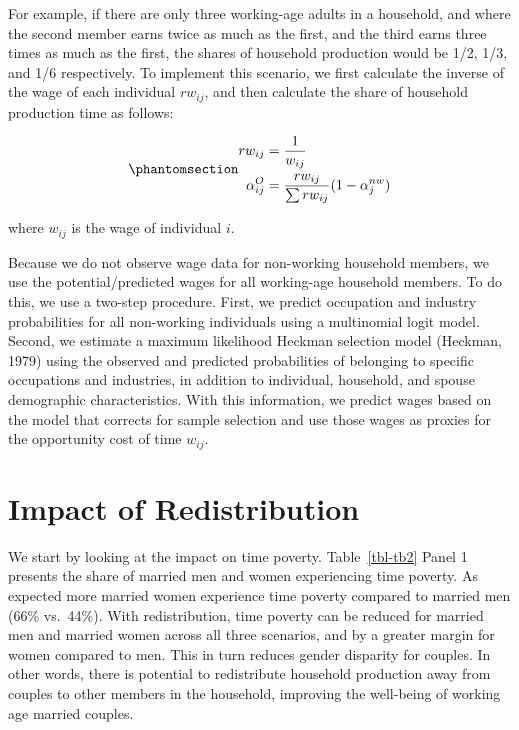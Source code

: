 \documentclass[
  11pt,
]{article}
\begin{document}
For example, if there are only three working-age adults in a household,
and where the second member earns twice as much as the first, and the
third earns three times as much as the first, the shares of household
production would be 1/2, 1/3, and 1/6 respectively. To implement this
scenario, we first calculate the inverse of the wage of each individual
\(rw_{ij}\), and then calculate the share of household production time
as follows:

\begin{equation}\phantomsection\label{eq-r3}{\begin{aligned}
rw_{ij} &= \frac{1}{w_{ij}} \\
\alpha_{ij}^O &= \frac{rw_{ij}}{\sum rw_{ij}} (1-\alpha_{j}^{nw})
\end{aligned}
}\end{equation}

where \(w_{ij}\) is the wage of individual \(i\).

Because we do not observe wage data for non-working household members,
we use the potential/predicted wages for all working-age household
members. To do this, we use a two-step procedure. First, we predict
occupation and industry probabilities for all non-working individuals
using a multinomial logit model. Second, we estimate a maximum
likelihood Heckman selection model (Heckman, 1979) using the observed
and predicted probabilities of belonging to specific occupations and
industries, in addition to individual, household, and spouse demographic
characteristics. With this information, we predict wages based on the
model that corrects for sample selection and use those wages as proxies
for the opportunity cost of time \(w_{ij}\).

\section{Impact of Redistribution}\label{impact-of-redistribution}

We start by looking at the impact on time poverty. Table~\ref{tbl-tb2}
Panel 1 presents the share of married men and women experiencing time
poverty. As expected more married women experience time poverty compared
to married men (66\% vs.~44\%). With redistribution, time poverty can be
reduced for married men and married women across all three scenarios,
and by a greater margin for women compared to men. This in turn reduces
gender disparity for couples. In other words, there is potential to
redistribute household production away from couples to other members in
the household, improving the well-being of working age married couples.
\end{document}
